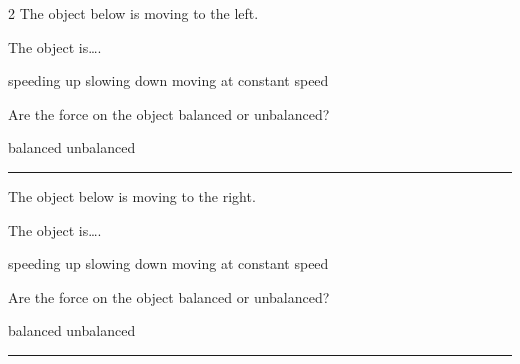 \documentclass[answers]{exam}
\begin{document}
\begin{questions}
\begin{multicols*}{2}
\question \label{ayuwJ}
The object below is moving to the left.

\begin{center}
\end{center}

The object is\dots .

\begin{randomizechoices}[norandomize]
    \choice speeding up
    \choice slowing down
    \correctchoice moving at constant speed 
\end{randomizechoices}

\question \label{vYsXn}
Are the force on the object balanced or unbalanced?

\begin{randomizechoices}[norandomize]
    \correctchoice balanced
    \choice unbalanced
\end{randomizechoices}

\bigskip
\hrule



\vspace*{\fill}
\columnbreak


\question 
The object below is moving to the right.

\begin{center}
\end{center}

The object is\dots .

\begin{randomizechoices}[norandomize]
    \choice speeding up
    \correctchoice slowing down
    \choice moving at constant speed 
\end{randomizechoices}

\question 
Are the force on the object balanced or unbalanced?

\begin{randomizechoices}[norandomize]
    \choice balanced
    \correctchoice unbalanced
\end{randomizechoices}

\bigskip
\hrule


\end{multicols*}
\end{questions}
\end{document}
